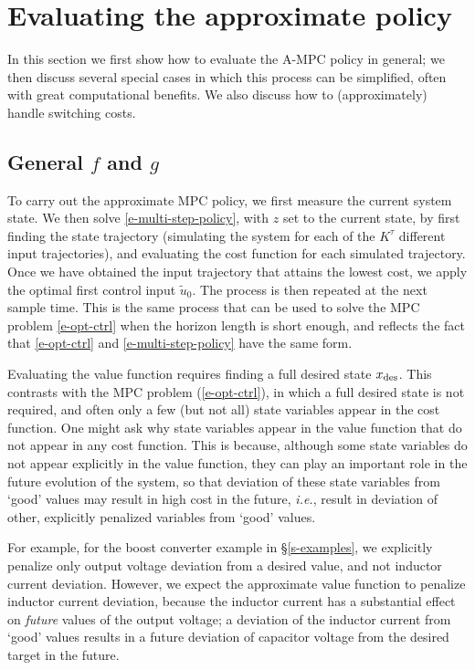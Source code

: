 \documentclass[12pt]{article}
\newcommand{\ie}{{\it i.e.}}
\begin{document}
\section{Evaluating the approximate policy}
\label{s-implementation}
In this section we first show how to evaluate the A-MPC policy in general;
we then discuss several special cases
in which this process can be simplified,
often with great computational benefits.
We also discuss how to (approximately) handle switching costs.


\subsection{General $f$ and $g$}
To carry out the approximate MPC policy,
we first measure the current system state.
We then solve \eqref{e-multi-step-policy},
with $z$ set to the current state,
by first finding the state trajectory 
(simulating the system for each of the $K^\tau$ different input trajectories),
and evaluating the cost function for each simulated trajectory.
Once we have obtained the input trajectory that attains the lowest cost,
we apply the optimal first control input $\tilde u_0$.
The process is then repeated at the next sample time.
This is the same process that can be used to solve the MPC problem \eqref{e-opt-ctrl}
when the horizon length is short enough,
and reflects the fact that 
\eqref{e-opt-ctrl} and \eqref{e-multi-step-policy}
have the same form.

Evaluating the value function requires finding a full desired state $x_{\rm des}$.
This contrasts with the MPC problem (\ref{e-opt-ctrl}),
in which a full desired state is not required,
and often only a few (but not all) state variables appear in the cost function.
One might ask why state variables appear in the value function
that do not appear in any cost function.
This is because, although some state variables do not appear explicitly
in the value function, 
they can play an important role in the future evolution of the system,
so that deviation of these state variables from `good' values
may result in high cost in the future,
\ie, result in deviation of other, explicitly penalized variables from `good' values.

For example, for the boost converter example in \S\ref{s-examples},
we explicitly penalize only output voltage deviation from a desired value,
and not inductor current deviation.
However, we expect the approximate value function to penalize
inductor current deviation,
because the inductor current has a substantial effect
on \emph{future} values of the output voltage;
a deviation of the inductor current from `good' values
results in a future deviation of capacitor voltage from the
desired target in the future.
\end{document}
